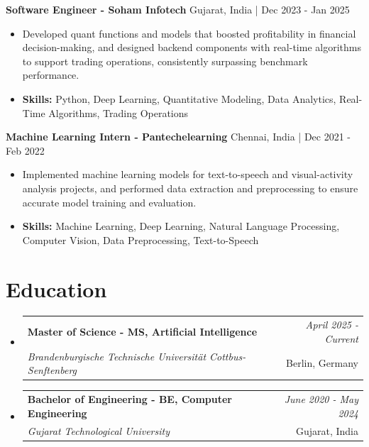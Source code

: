 \documentclass[a4paper,11pt]{article}
\makeatletter
\newcommand{\resumeSubheading}[4]{
\vspace{0.5mm}\item
    \begin{tabular*}{\linewidth}[t]{l@{\extracolsep{\fill}}r}
        \textbf{#1} & \textit{\footnotesize{#4}} \\
        \textit{\footnotesize{#3}} &  \footnotesize{#2}\\
    \end{tabular*}
    \vspace{-2.4mm}
}
\makeatother
\begin{document}
\vspace{1mm}
  \textbf{Software Engineer - Soham Infotech} \hfill Gujarat, India | Dec 2023 - Jan 2025
\vspace{-1.5mm} %
\begin{itemize}
  \item Developed quant functions and models that boosted profitability in financial decision-making, and designed backend components with real-time algorithms to support trading operations, consistently surpassing benchmark performance.

\vspace{-2mm}
  \item \textbf{Skills:} Python, Deep Learning, Quantitative Modeling, Data Analytics, Real-Time Algorithms, Trading Operations
\end{itemize}

\vspace{1mm}
  \textbf{Machine Learning Intern - Pantechelearning} \hfill Chennai, India | Dec 2021 - Feb 2022
\vspace{-1.5mm} %
\begin{itemize}
  \item Implemented machine learning models for text-to-speech and visual-activity analysis projects, and performed data extraction and preprocessing to ensure accurate model training and evaluation.
\vspace{-2mm}
  \item \textbf{Skills:} Machine Learning, Deep Learning, Natural Language Processing, Computer Vision, Data Preprocessing, Text-to-Speech
\end{itemize}\section{\textbf{Education}}
\vspace{-0.4mm}

\begin{itemize}[leftmargin=0.15in, label={}]
\resumeSubheading
{Master of Science - MS, Artificial Intelligence }{Berlin, Germany}
{Brandenburgische Technische Universität Cottbus-Senftenberg  }{April 2025 - Current}

\vspace{1.0mm} %
\resumeSubheading
{Bachelor of Engineering - BE, Computer Engineering  }{Gujarat, India}
{Gujarat Technological University }{June 2020 - May 2024}

\end{itemize}
\end{document}
